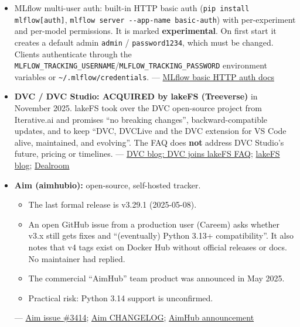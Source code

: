 \documentclass{article}
\begin{document}
\begin{itemize}
\item MLflow multi-user auth: built-in HTTP basic auth (\texttt{pip install mlflow[auth]}, \texttt{mlflow server -\allowbreak{}-\allowbreak{}app-\allowbreak{}name basic-\allowbreak{}auth}) with per-experiment and per-model permissions. It is marked \textbf{experimental}. On first start it creates a default admin \texttt{admin} /\allowbreak{} \texttt{password1234}, which must be changed. Clients authenticate through the \texttt{MLFLOW\_\allowbreak{}TRACKING\_\allowbreak{}USERNAME}/\allowbreak{}\texttt{MLFLOW\_\allowbreak{}TRACKING\_\allowbreak{}PASSWORD} environment variables or \texttt{\textasciitilde{}/\allowbreak{}.\allowbreak{}mlflow/\allowbreak{}credentials}. --- \href{https://mlflow.org/docs/latest/self-hosting/security/basic-http-auth/}{MLflow basic HTTP auth docs}

\item \textbf{DVC /\allowbreak{} DVC Studio: ACQUIRED by lakeFS (Treeverse)} in November 2025. lakeFS took over the DVC open-source project from Iterative.ai and promises ``no breaking changes'', backward-compatible updates, and to keep ``DVC, DVCLive and the DVC extension for VS Code alive, maintained, and evolving''. The FAQ does \textbf{not} address DVC Studio's future, pricing or timelines. --- \href{https://dvc.org/blog/dvc-joins-lakefs-your-questions-answered/}{DVC blog: DVC joins lakeFS FAQ}; \href{https://lakefs.io/blog/celebration-shared-vision-lakefs-dvc/}{lakeFS blog}; \href{https://app.dealroom.co/news/feed/lakefs-acquires-dvc-raises-20m}{Dealroom}

\item \textbf{Aim (aimhubio):} open-source, self-hosted tracker.

\begin{itemize}

\item The last formal release is v3.29.1 (2025-05-08).

\item An open GitHub issue from a production user (Careem) asks whether v3.x still gets fixes and ``(eventually) Python 3.13+ compatibility''. It also notes that v4 tags exist on Docker Hub without official releases or docs. No maintainer had replied.

\item The commercial ``AimHub'' team product was announced in May 2025.

\item Practical risk: Python 3.14 support is unconfirmed.

\end{itemize}

--- \href{https://github.com/aimhubio/aim/issues/3414}{Aim issue \#3414}; \href{https://github.com/aimhubio/aim/blob/main/CHANGELOG.md}{Aim CHANGELOG}; \href{https://aimstack.io/blog/new-releases/introducing-aimhub-aim-now-available-for-teams}{AimHub announcement}

\end{itemize}
\end{document}
